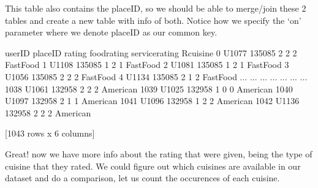 \documentclass[letterpaper,10pt,english]{jupyterBook}
\begin{document}
\sphinxAtStartPar
This table also contains the placeID, so we should be able to merge/join these 2 tables and create a new table with info of both.
Notice how we specify the ‘on’ parameter where we denote placeID as our common key.

\begin{sphinxVerbatim}[commandchars=\\\{\}]
     
\end{sphinxVerbatim}

\begin{sphinxVerbatim}[commandchars=\\\{\}]
     userID  placeID  rating  food\PYGZus{}rating  service\PYGZus{}rating   Rcuisine
0     U1077   135085       2            2               2  Fast\PYGZus{}Food
1     U1108   135085       1            2               1  Fast\PYGZus{}Food
2     U1081   135085       1            2               1  Fast\PYGZus{}Food
3     U1056   135085       2            2               2  Fast\PYGZus{}Food
4     U1134   135085       2            1               2  Fast\PYGZus{}Food
...     ...      ...     ...          ...             ...        ...
1038  U1061   132958       2            2               2   American
1039  U1025   132958       1            0               0   American
1040  U1097   132958       2            1               1   American
1041  U1096   132958       1            2               2   American
1042  U1136   132958       2            2               2   American

[1043 rows x 6 columns]
\end{sphinxVerbatim}

\sphinxAtStartPar
Great! now we have more info about the rating that were given, being the type of cuisine that they rated.
We could figure out which cuisines are available in our dataset and do a comparison, let us count the occurences of each cuisine.

\begin{sphinxVerbatim}[commandchars=\\\{\}]
\end{sphinxVerbatim}
\end{document}
